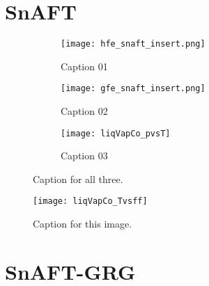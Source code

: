 \section{SnAFT}



\begin{figure}[H]
	\centering
	\begin{subfigure}[b]{0.3\textwidth}
	\texttt{[image: hfe\_snaft\_insert.png]}
	\caption{Caption 01}
	\label{fig:cap01}
	\end{subfigure}
	\hfill
	\begin{subfigure}[b]{0.3\textwidth}
	\texttt{[image: gfe\_snaft\_insert.png]}
	\caption{Caption 02}
	\label{fig:cap02}
	\end{subfigure}
	\hfill
	\begin{subfigure}[b]{0.3\textwidth}
	\texttt{[image: liqVapCo\_pvsT]}
	\caption{Caption 03}
	\label{fig:cap01}
	\end{subfigure}
	\caption{Caption for all three.}
	\label{fig:cap3}
\end{figure}



%
%
%
%
%
%
%



\begin{figure}[H]
	\centering
	\texttt{[image: liqVapCo\_Tvsff]}
	\caption{Caption for this image.}
	\label{fig:liqVapCo_Tvsff}
\end{figure}




\section{SnAFT-GRG}


